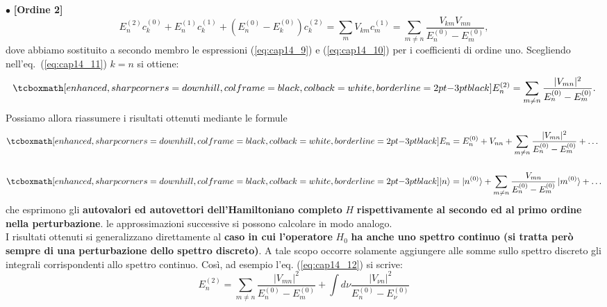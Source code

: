 $\bullet$ \textbf{[Ordine 2]}\\
	\begin{equation}
			E_n^{(2)}c_k^{(0)}+E_n^{(1)}c_k^{(1)}+ \left( E_n^{(0)}-E_k ^{(0)}\right) c_k^{(2)}  = \sum _m V_{km} c_m ^{(1)} = \sum _{m\neq n} \frac{V_{km} V_{mn}}{E_n^{(0)}-E_m ^{(0)}},
	\label{eq:cap14_11}
	\end{equation}
dove abbiamo sostituito a secondo membro le espressioni (\ref{eq:cap14_9}) e (\ref{eq:cap14_10}) per i coefficienti di ordine uno. Scegliendo nell'eq.~(\ref{eq:cap14_11}) $k=n$ si ottiene:
	\begin{equation}
		\tcboxmath[enhanced, sharp corners=downhill, colframe=black, colback=white, borderline={2pt}{-3pt}{black}]{
			E_n ^{(2)} = \sum _{m \neq n } \frac{\vert V_{mn} \vert ^2}{E_n ^{(0)}-E_m ^{(0)}}.
			}
	\label{eq:cap14_12}
	\end{equation}
Possiamo allora riassumere i risultati ottenuti mediante le formule
	\begin{align}
		& \tcboxmath[enhanced, sharp corners=downhill, colframe=black, colback=white, borderline={2pt}{-3pt}{black}]{
			E_n = E_n ^{(0)}+ V_{nn} +\sum _{m \neq n } \frac{\vert V_{mn} \vert ^2}{E_n ^{(0)}-E_m ^{(0)}}+ \dots
			} \\[0.5cm]
		& \tcboxmath[enhanced, sharp corners=downhill, colframe=black, colback=white, borderline={2pt}{-3pt}{black}]{
 			\vert n \rangle = \vert n^{(0)} \rangle +\sum _{m \neq n } \frac{V_{mn} }{E_n ^{(0)}-E_m ^{(0)}}\, \vert m^{(0)}\rangle+ \dots 
			 }
	\end{align}
che esprimono gli \textbf{autovalori ed autovettori dell'Hamiltoniano completo} $H$ \textbf{rispettivamente al secondo ed al primo ordine nella perturbazione}. le approssimazioni successive si possono calcolare in modo analogo.\\

I risultati ottenuti si generalizzano direttamente al \textbf{caso in cui l'operatore} $H_0$ \textbf{ha anche uno spettro continuo (si tratta però sempre di una perturbazione dello spettro discreto)}. A tale scopo occorre solamente aggiungere alle somme sullo spettro discreto gli integrali corrispondenti allo spettro continuo. Così, ad esempio l'eq. (\ref{eq:cap14_12}) si scrive:
	\begin{equation}
		E_n ^{(2)} = \sum _{m \neq n} \frac{\vert V_{mn} \vert ^2}{E_n ^{(0)}-E_m ^{(0)}}+ \int d\nu \frac{\vert V_{\nu n} \vert ^2}{E_n ^{(0)}-E_{\nu} ^{(0)}} 
	\end{equation}
